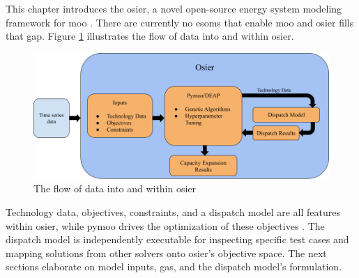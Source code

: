 
This chapter introduces the \acf{osier}, a novel open-source energy system modeling
framework for \acl{moo} \cite{dotson_osier_2024}. There are currently no
\acp{esom} that enable \ac{moo} and \ac{osier} fills that gap. Figure 
\ref{fig:osier_flow} illustrates the flow of data into and within \ac{osier}.

\begin{figure}[H]
    \centering
    \includegraphics[width=\columnwidth]{figures/osier_flow}
    \caption{The flow of data into and within \ac{osier}}
    \label{fig:osier_flow}
\end{figure}

Technology data, objectives, constraints, and a dispatch model are all features
within \ac{osier}, while \ac{pymoo} drives the optimization of these objectives \cite{blank_pymoo_2020}.
The dispatch model is independently executable for inspecting specific test
cases and mapping solutions from other solvers onto \ac{osier}'s objective
space. The next sections elaborate on model inputs, \acfp{ga}, and the dispatch model's 
formulation.






